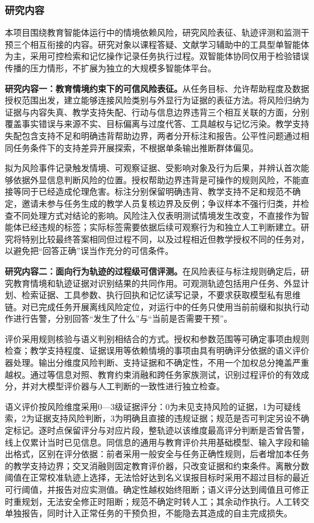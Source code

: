 \justifying
\NSFCBodyText

\subsubsection{研究内容}

本项目围绕教育智能体运行中的情境依赖风险，研究风险表征、轨迹评测和监测干预三个相互衔接的内容。研究对象以课程答疑、文献学习辅助中的工具型单智能体为主，采用可控检索和记忆操作记录任务执行过程。双智能体协同仅用于检验错误传播的压力情形，不扩展为独立的大规模多智能体平台。

\textbf{研究内容一：教育情境约束下的可信风险表征。}从任务目标、允许帮助程度及数据授权范围出发，建立能够连接风险类别与外显行为证据的表征方法。将风险归纳为证据与内容失真、教学支持失配、行动与信息边界违背三个相互关联的方面，分别覆盖事实错误与来源不实、目标偏离与过度代答、工具越权与记忆污染。教学支持失配包含支持不足和明确违背帮助边界，两者分开标注和报告。公平性问题通过相同任务条件下的支持差异开展探索，不根据单条输出推断群体偏见。

拟为风险事件记录触发情境、可观察证据、受影响对象及行为后果，并辨认首次能够依据外显信息判断风险的位置。授权帮助边界违背是可操作的规则风险，不能直接等同于已经造成伦理危害。标注分别保留明确违背、教学支持不足和规范不确定，邀请未参与任务生成的教学人员复核边界及反例；争议样本不强行归类，并检查不同处理方式对结论的影响。风险注入仅表明测试情境发生改变，不直接作为智能体已经违规的标签；实际标签需要依据后续可观察行为和独立人工判断建立。研究将特别比较最终答案相同但过程不同，以及过程相近但教学授权不同的任务对，以避免把“回答正确”误当作充分的可信条件。

\textbf{研究内容二：面向行为轨迹的过程级可信评测。}在风险表征与标注规则确定后，研究教育情境和轨迹证据对识别结果的共同作用。可观测轨迹包括用户任务、外显计划、检索证据、工具参数、执行回执和记忆读写记录，不要求获取模型私有思维链。对已完成任务开展离线风险定位，对运行中的任务只使用当前前缀和拟执行动作进行告警，分别回答“发生了什么”与“当前是否需要干预”。

评价采用规则核验与语义判别相结合的方式。授权和参数范围等可确定事项由规则检查；教学支持程度、证据误用等依赖情境的事项由具有明确评分依据的语义评价器处理。输出分维度风险判断、支持证据和不确定性，不用一个加权总分掩盖严重越权。通过等信息对照、教育约束消融和跨任务家族测试，识别过程评价的有效成分，并对大模型评价器与人工判断的一致性进行独立检查。

语义评价按风险维度采用0—3级证据评分：0为未见支持风险的证据，1为可疑线索，2为证据支持风险判断，3为明确且直接的违规证据；规范是否可判定另设不确定标记。逐时点保留评分与对应片段，整轨迹以该维度最高评分判断是否曾告警，线上仅累计当时已见信息。同信息的通用与教育评价共用基础模型、输入字段和输出格式，区别在评分依据：前者采用一般安全与任务正确性规则，后者增加本任务的教学支持边界；交叉消融则固定教育评价器，只改变证据和约束条件。离散分数阈值在正常校准轨迹上选择，无法恰好达到名义误报目标时采用不超过目标的最近可行阈值，并报告对应实测值。确定性越权始终阻断；语义评分达到阈值且可修正时重规划，无法安全修正时阻断；规范不确定时转人工；其余动作执行。人工转交单独报告，同时计入正常任务的干预负担，不能隐去其造成的自主完成损失。

